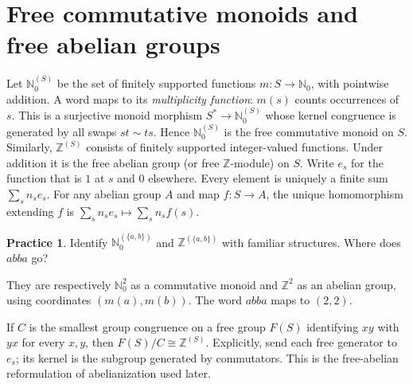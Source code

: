 \documentclass[11pt,openany]{book}
\newcommand{\N}{\mathbb N}\newcommand{\Z}{\mathbb Z}
\theoremstyle{definition}
\newtheorem{exercise}[theorem]{Practice}
\begin{document}
\section{Free commutative monoids and free abelian groups}
Let $\N_0^{(S)}$ be the set of finitely supported functions $m:S\to\N_0$, with pointwise addition. A word maps to its \emph{multiplicity function}: $m(s)$ counts occurrences of $s$. This is a surjective monoid morphism $S^*\to\N_0^{(S)}$ whose kernel congruence is generated by all swaps $st\sim ts$. Hence $\N_0^{(S)}$ is the free commutative monoid on $S$.
Similarly, $\Z^{(S)}$ consists of finitely supported integer-valued functions. Under addition it is the free abelian group (or free $\Z$-module) on $S$. Write $e_s$ for the function that is $1$ at $s$ and $0$ elsewhere. Every element is uniquely a finite sum $\sum_s n_se_s$. For any abelian group $A$ and map $f:S\to A$, the unique homomorphism extending $f$ is $\sum_s n_se_s\mapsto\sum_s n_sf(s)$.
\begin{exercise}Identify $\N_0^{(\{a,b\})}$ and $\Z^{(\{a,b\})}$ with familiar structures. Where does $abba$ go?\end{exercise}
\begin{solution}They are respectively $\N_0^2$ as a commutative monoid and $\Z^2$ as an abelian group, using coordinates $(m(a),m(b))$. The word $abba$ maps to $(2,2)$.\end{solution}
If $C$ is the smallest group congruence on a free group $F(S)$ identifying $xy$ with $yx$ for every $x,y$, then $F(S)/C\cong\Z^{(S)}$. Explicitly, send each free generator to $e_s$; its kernel is the subgroup generated by commutators. This is the free-abelian reformulation of abelianization used later.
\end{document}
